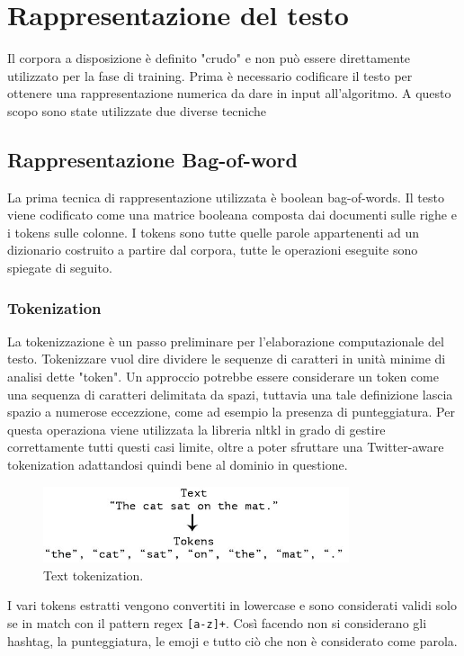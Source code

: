 \documentclass[oneside]{book}
\begin{document}
\section{Rappresentazione del testo}
Il corpora a disposizione è definito "crudo" e non può essere direttamente utilizzato per la fase di training. Prima è necessario codificare il testo per ottenere una rappresentazione numerica da dare in input all'algoritmo. A questo scopo sono state utilizzate due diverse tecniche

\subsection{Rappresentazione Bag-of-word}
La prima tecnica di rappresentazione utilizzata è boolean bag-of-words.
Il testo viene codificato come una matrice booleana composta dai documenti sulle righe e i tokens sulle colonne. I tokens sono tutte quelle parole appartenenti ad un dizionario costruito a partire dal corpora, tutte le operazioni eseguite sono spiegate di seguito.

\subsubsection{Tokenization}
La tokenizzazione è un passo preliminare per l'elaborazione computazionale del testo. Tokenizzare vuol dire dividere le sequenze di caratteri in unità minime di analisi dette "token". Un approccio potrebbe essere considerare un token come una sequenza di caratteri delimitata da spazi, tuttavia una tale definizione lascia spazio a numerose eccezzione, come ad esempio la presenza di punteggiatura. Per questa operaziona viene utilizzata la libreria
nltkl \cite{nltk} in grado di gestire correttamente tutti questi casi limite, oltre a poter sfruttare una Twitter-aware tokenization adattandosi quindi bene al dominio in questione.

\begin{figure}[!h]
	\centering
	\includegraphics[width=9cm]{assets/text-to-tokens.jpg}
	\caption{Text tokenization.}
	\label{fig:tokenization}
\end{figure}


\pagebreak

I vari tokens estratti vengono convertiti in lowercase e sono considerati validi solo se in match con il pattern regex \texttt{[a-z]+}. Così facendo non si considerano gli hashtag, la punteggiatura, le emoji e tutto ciò che non è considerato come parola.
\end{document}
